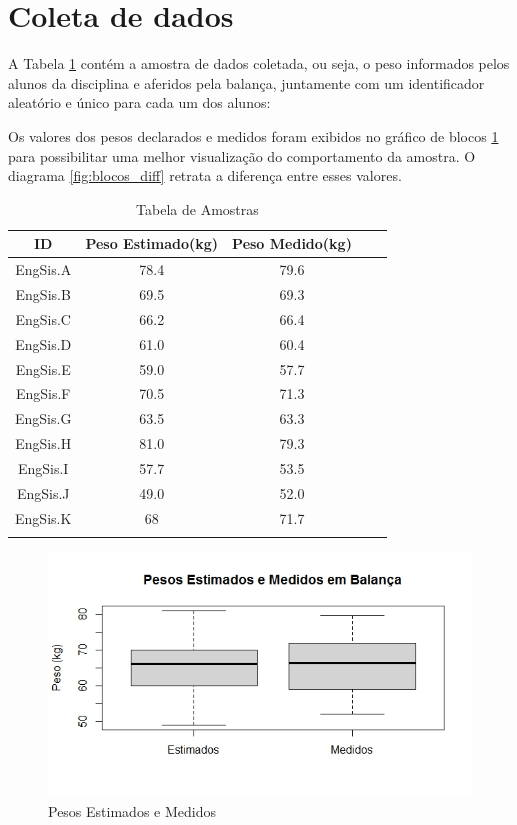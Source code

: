 \documentclass[12pt, a4paper]{article}
\begin{document}
\section{Coleta de dados}
A Tabela \ref{table:amostra} contém a amostra de dados coletada, ou seja, o peso informados pelos alunos da disciplina e aferidos pela balança, juntamente com um identificador aleatório e único para cada um dos alunos:
\par Os valores dos pesos declarados e medidos foram exibidos no gráfico de blocos \ref{fig:blocos} para possibilitar uma melhor visualização do comportamento da amostra. O diagrama \ref{fig:blocos_diff} retrata a diferença entre esses valores.
\begin{longtable}{|c|c|c|c|c|}
\hline
\rule[-1.0ex]{0pt}{4.0ex}
\textbf{ID}&\textbf{Peso Estimado(kg)}&\textbf{Peso Medido(kg)}\\ \hline
\endhead
\rule[-1.0ex]{0pt}{4.0ex}
EngSis.A&78.4&79.6 \\ \hline
\rule[-1.0ex]{0pt}{4.0ex}
EngSis.B&69.5&69.3 \\ \hline
\rule[-1.0ex]{0pt}{4.0ex}
EngSis.C&66.2&66.4 \\ \hline
\rule[-1.0ex]{0pt}{4.0ex}
EngSis.D&61.0&60.4 \\ \hline
\rule[-1.0ex]{0pt}{4.0ex}
EngSis.E&59.0&57.7 \\ \hline
\rule[-1.0ex]{0pt}{4.0ex}
EngSis.F&70.5&71.3 \\ \hline
\rule[-1.0ex]{0pt}{4.0ex}
EngSis.G&63.5&63.3 \\ \hline
\rule[-1.0ex]{0pt}{4.0ex}
EngSis.H&81.0&79.3 \\ \hline
\rule[-1.0ex]{0pt}{4.0ex}
EngSis.I&57.7&53.5 \\ \hline
\rule[-1.0ex]{0pt}{4.0ex}
EngSis.J&49.0&52.0 \\ \hline
\rule[-1.0ex]{0pt}{4.0ex}
EngSis.K&68&71.7 \\ \hline
\caption{Tabela de Amostras}
\label{table:amostra}
\end{longtable}
\begin{figure}[h]
\centering
\includegraphics[scale=0.6]{img/box.jpeg}
\caption{Pesos Estimados e Medidos}
\label{fig:blocos}
\end{figure}
\end{document}
